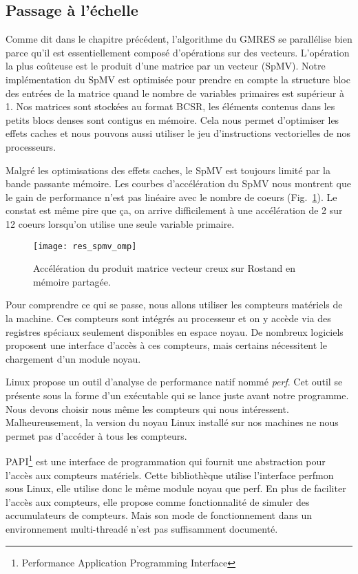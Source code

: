 \subsection{Passage à l'échelle}
Comme dit dans le chapitre précédent, l'algorithme du GMRES se parallélise bien parce qu'il est essentiellement composé d'opérations sur des vecteurs.
%
L'opération la plus coûteuse est le produit d'une matrice par un vecteur (SpMV).
%
Notre implémentation du SpMV est optimisée pour prendre en compte la structure bloc des entrées de la matrice quand le nombre de variables primaires est supérieur à 1.
%
Nos matrices sont stockées au format BCSR, les éléments contenus dans les petits blocs denses sont contigus en mémoire.
%
Cela nous permet d'optimiser les effets caches et nous pouvons aussi utiliser le jeu d'instructions vectorielles de nos processeurs.

Malgré les optimisations des effets caches, le SpMV est toujours limité par la bande passante mémoire.
%
Les courbes d'accélération du SpMV nous montrent que le gain de performance n'est pas linéaire avec le nombre de coeurs (Fig.~\ref{fig:res_spmv_omp_rostand}).
%
Le constat est même pire que ça, on arrive difficilement à une accélération de 2 sur 12 coeurs lorsqu'on utilise une seule variable primaire.
\begin{figure}[!h]
  \centering
  \texttt{[image: res\_spmv\_omp]}
  \caption{Accélération du produit matrice vecteur creux sur Rostand en mémoire partagée.}
  \label{fig:res_spmv_omp_rostand}
\end{figure}

Pour comprendre ce qui se passe, nous allons utiliser les compteurs matériels de la machine.
%
Ces compteurs sont intégrés au processeur et on y accède via des registres spéciaux seulement disponibles en espace noyau.
%
De nombreux logiciels proposent une interface d'accès à ces compteurs, mais certains nécessitent le chargement d'un module noyau.


Linux propose un outil d'analyse de performance natif nommé {\em perf}.
%
Cet outil se présente sous la forme d'un exécutable qui se lance juste avant notre programme.
%
Nous devons choisir nous même les compteurs qui nous intéressent.
%
Malheureusement, la version du noyau Linux installé sur nos machines ne nous permet pas d'accéder à tous les compteurs.



PAPI\footnote{Performance Application Programming Interface} est une interface de programmation qui fournit une abstraction pour l'accès aux compteurs matériels.
%
Cette bibliothèque utilise l'interface perfmon sous Linux, elle utilise donc le même module noyau que perf.
%
En plus de faciliter l'accès aux compteurs, elle propose comme fonctionnalité de simuler des accumulateurs de compteurs.
%
Mais son mode de fonctionnement dans un environnement multi-threadé n'est pas suffisamment documenté.




